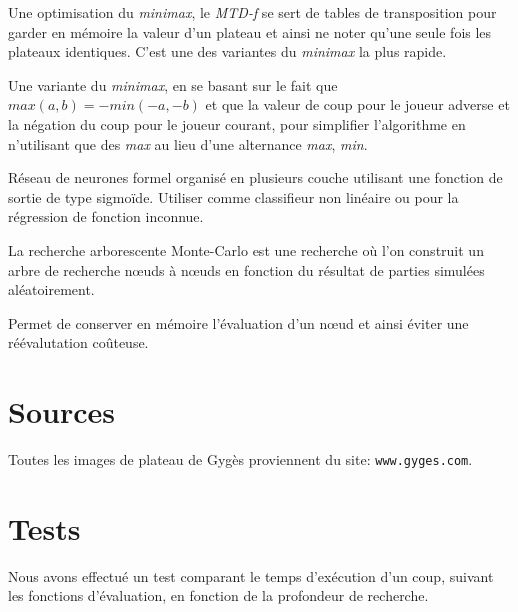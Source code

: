 \documentclass[a4paper]{article}
\begin{document}
\begin{description}[style=nextline]
		\item[MTD-f] Une optimisation du \emph{minimax}, le \emph{MTD-f} se sert de tables de transposition
		pour garder en mémoire la valeur d'un plateau et ainsi ne noter qu'une seule fois les plateaux identiques.
		C'est une des variantes du \emph{minimax} la plus rapide.

		\item[Negamax] Une variante du \emph{minimax}, en se basant sur le fait
		que $max(a,b) = -min(-a,-b)$ et que la valeur de coup pour le joueur adverse et la négation du
		coup pour le joueur courant, pour simplifier l'algorithme en n'utilisant que des \emph{max}
		au lieu d'une alternance \emph{max}, \emph{min}.

		\item[Perceptron multicouche] Réseau de neurones formel organisé en plusieurs couche utilisant une fonction de sortie
		de type sigmoïde. Utiliser comme classifieur non linéaire ou pour la régression de fonction inconnue.

		\item[Recherche Monte-Carlo (Monte-Carlo Tree Search)] La recherche arborescente Monte-Carlo est une recherche
		où l'on construit un arbre de recherche n\oe{}uds à n\oe{}uds en fonction du résultat de parties simulées aléatoirement.

		\item[Table de transposition] Permet de conserver en mémoire l'évaluation d'un n\oe{}ud et ainsi éviter une réévalutation
		coûteuse.
	\end{description}

\section{Sources}
	Toutes les images de plateau de Gygès proviennent du site: \texttt{www.gyges.com}.

\section{Tests}
	Nous avons effectué un test comparant le temps d'exécution d'un coup, suivant les fonctions d'évaluation, en fonction de la
	profondeur de recherche.
\end{document}
